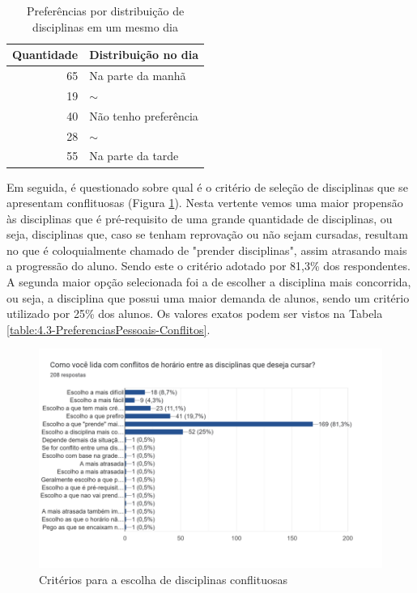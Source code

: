         \begin{table}[htbp]
            \centering
            \caption{\label{table:4.2-PreferenciasPessoais-Manha_Tarde}Preferências por distribuição de disciplinas em um mesmo dia}
            \begin{tabular}{| r l |}
                \hline
                    \textbf{Quantidade} & \textbf{Distribuição no dia} \\
                \hline
                    65 & Na parte da manhã     \\
                    19 & $\sim$                \\
                    40 & Não tenho preferência \\
                    28 & $\sim$                \\
                    55 & Na parte da tarde     \\
                \hline
            \end{tabular}
        \end{table}

        Em seguida, é questionado sobre qual é o critério de seleção de disciplinas que se apresentam conflituosas (Figura \ref{fig:4.3-PreferenciasPessoais-Conflitos}). Nesta vertente vemos uma maior propensão às disciplinas que é pré-requisito de uma grande quantidade de disciplinas, ou seja, disciplinas que, caso se tenham reprovação ou não sejam cursadas, resultam no que é coloquialmente chamado de "prender disciplinas", assim atrasando mais a progressão do aluno. Sendo este o critério adotado por 81,3\% dos respondentes. A segunda maior opção selecionada foi a de escolher a disciplina mais concorrida, ou seja, a disciplina que possui uma maior demanda de alunos, sendo um critério utilizado por 25\% dos alunos. Os valores exatos podem ser vistos na Tabela \ref{table:4.3-PreferenciasPessoais-Conflitos}.

        \begin{figure}[htbp]\centering
            \caption{\label{fig:4.3-PreferenciasPessoais-Conflitos}Critérios para a escolha de disciplinas conflituosas}
            \includegraphics[scale=0.6]{files/img/Forms/4.3-PreferenciasPessoais-Conflitos.png}
        \end{figure} %


